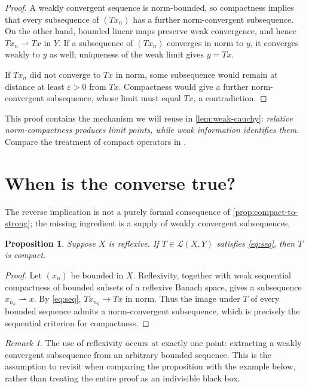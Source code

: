 \documentclass[11pt,a4paper]{article}
\newtheorem{proposition}[proposition]{Proposition}
\theoremstyle{definition}
\theoremstyle{remark}
\newtheorem{remark}[remark]{Remark}
\newcommand{\cL}{\mathcal{L}}
\newcommand{\weakto}{\rightharpoonup}
\begin{document}
\begin{proof}
A weakly convergent sequence is norm-bounded, so compactness implies
that every subsequence of $(Tx_n)$ has a further norm-convergent
subsequence.  On the other hand, bounded linear maps preserve weak
convergence, and hence $Tx_n\weakto Tx$ in $Y$.  If a subsequence of
$(Tx_n)$ converges in norm to $y$, it converges weakly to $y$ as well;
uniqueness of the weak limit gives $y=Tx$.

If $Tx_n$ did not converge to $Tx$ in norm, some subsequence would remain
at distance at least $\varepsilon>0$ from $Tx$.  Compactness would give
a further norm-convergent subsequence, whose limit must equal $Tx$,
a contradiction.
\end{proof}

This proof contains the mechanism we will reuse in
\cref{lem:weak-cauchy}: \emph{relative norm-compactness produces limit
points, while weak information identifies them}.  Compare the treatment
of compact operators in \cite{lecture-notes}.

\section{When is the converse true?}\label{sec:converse}

The reverse implication is not a purely formal consequence of
\cref{prop:compact-to-strong}; the missing ingredient is a supply of
weakly convergent subsequences.

\begin{proposition}\label{prop:reflexive-converse}
Suppose $X$ is reflexive.  If $T\in\cL(X,Y)$ satisfies
\eqref{eq:seq}, then $T$ is compact.
\end{proposition}

\begin{proof}
Let $(x_n)$ be bounded in $X$.  Reflexivity, together with weak
sequential compactness of bounded subsets of a reflexive Banach space,
gives a subsequence $x_{n_k}\weakto x$.  By \eqref{eq:seq},
$Tx_{n_k}\to Tx$ in norm.  Thus the image under $T$ of every bounded
sequence admits a norm-convergent subsequence, which is precisely the
sequential criterion for compactness.
\end{proof}

\begin{remark}\label{rem:hinge}
The use of reflexivity occurs at exactly one point: extracting a weakly
convergent subsequence from an arbitrary bounded sequence.  This is the
assumption to revisit when comparing the proposition with the example
below, rather than treating the entire proof as an indivisible black box.
\end{remark}
\end{document}
